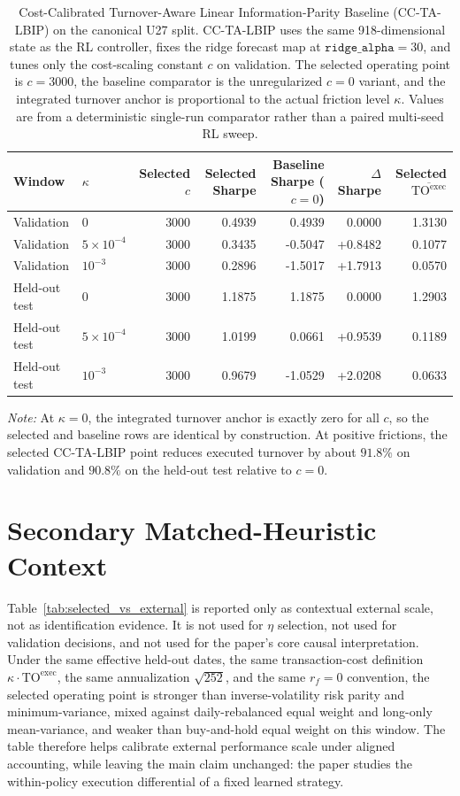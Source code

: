 \documentclass[10pt,twocolumn]{article}
\newcommand{\TOexec}{\mathrm{TO}^{\mathrm{exec}}}
\newcommand{\kappaTC}{\kappa}
\begin{document}
\begin{table}[H]
\centering
\scriptsize
\caption{Cost-Calibrated Turnover-Aware Linear Information-Parity Baseline (CC-TA-LBIP) on the canonical U27 split. CC-TA-LBIP uses the same 918-dimensional state as the RL controller, fixes the ridge forecast map at $\texttt{ridge\_alpha}=30$, and tunes only the cost-scaling constant $c$ on validation. The selected operating point is $c=3000$, the baseline comparator is the unregularized $c=0$ variant, and the integrated turnover anchor is proportional to the actual friction level $\kappa$. Values are from a deterministic single-run comparator rather than a paired multi-seed RL sweep.}
\label{tab:cctalibp_u27}
\begin{tabular}{@{}llrrrrr@{}}
\toprule
Window & $\kappa$ & Selected $c$ & Selected Sharpe & Baseline Sharpe ($c=0$) & $\Delta$Sharpe & Selected $\overline{\TOexec}$ \\
\midrule
Validation & $0$ & 3000 & 0.4939 & 0.4939 & 0.0000 & 1.3130 \\
Validation & $5\times10^{-4}$ & 3000 & 0.3435 & -0.5047 & +0.8482 & 0.1077 \\
Validation & $10^{-3}$ & 3000 & 0.2896 & -1.5017 & +1.7913 & 0.0570 \\
Held-out test & $0$ & 3000 & 1.1875 & 1.1875 & 0.0000 & 1.2903 \\
Held-out test & $5\times10^{-4}$ & 3000 & 1.0199 & 0.0661 & +0.9539 & 0.1189 \\
Held-out test & $10^{-3}$ & 3000 & 0.9679 & -1.0529 & +2.0208 & 0.0633 \\
\bottomrule
\end{tabular}
\par\vspace{2pt}\raggedright\footnotesize{\textit{Note:} At $\kappa=0$, the integrated turnover anchor is exactly zero for all $c$, so the selected and baseline rows are identical by construction. At positive frictions, the selected CC-TA-LBIP point reduces executed turnover by about $91.8\%$ on validation and $90.8\%$ on the held-out test relative to $c=0$.}
\end{table}

\section{Secondary Matched-Heuristic Context}
\label{app:secondary_heuristics}
Table~\ref{tab:selected_vs_external} is reported only as contextual external scale, not as identification evidence. It is not used for $\eta$ selection, not used for validation decisions, and not used for the paper's core causal interpretation. Under the same effective held-out dates, the same transaction-cost definition $\kappaTC\cdot\TOexec$, the same annualization $\sqrt{252}$, and the same $r_f=0$ convention, the selected operating point is stronger than inverse-volatility risk parity and minimum-variance, mixed against daily-rebalanced equal weight and long-only mean-variance, and weaker than buy-and-hold equal weight on this window. The table therefore helps calibrate external performance scale under aligned accounting, while leaving the main claim unchanged: the paper studies the within-policy execution differential of a fixed learned strategy.
\end{document}
